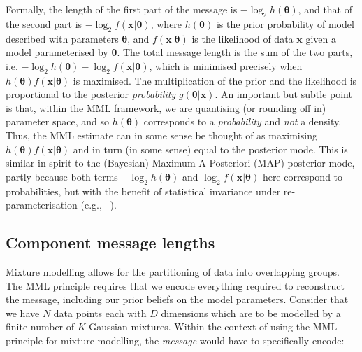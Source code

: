 \documentclass{elsarticle}
\newcommand{\vect}[1]{\boldsymbol{\mathbf{#1}}}
\renewcommand{\vec}[1]{\vect{#1}}
\begin{document}
Formally, the length of the first part of the message is
    $-\log_{2}h(\vec{\theta})$, 
and that of the second part is 
    $-\log_{2}f(\vec{x}|\vec{\theta})$, 
where $h(\vec{\theta})$ is the prior probability of model described with 
parameters $\vec{\theta}$, and 
    $f(\vec{x}|\vec{\theta})$ 
is the likelihood of data $\vec{x}$ given a model parameterised by $\vec{\theta}$. 
The total message length is the sum of the two parts, i.e. 
    $-\log_{2} h(\vec{\theta}) - \log_{2}f(\vec{x} | \vec{\theta})$, 
which is minimised precisely when $h(\vec{\theta}) f(\vec{x}|\vec{\theta})$
is maximised. The multiplication of the prior and the likelihood is 
proportional to the posterior {\em probability} $g(\vec{\theta}|\vec{x})$. 
An important but subtle point is that, within the MML framework, we are 
quantising (or rounding off in) parameter space, and so 
$h(\vec{\theta})$ corresponds to a {\em probability} and {\em not} 
a density. Thus, the MML estimate can in some sense be thought of as maximising 
    $h(\vec{\theta})f(\vec{x}|\vec{\theta})$ 
and in turn (in some sense) equal to the posterior mode. This is similar in 
spirit to the (Bayesian) Maximum A Posteriori (MAP) posterior mode, partly 
because both terms 
    $-\log_{2}h(\vec{\theta})$
and 
    $\log_{2} f(\vec{x}|\vec{\theta})$ 
here correspond to probabilities, but with the benefit of statistical 
invariance under re-parameterisation (e.g., ~\cite{WallaceFreeman1987,WallaceDowe1999a,Wallace05,dowe2007bayes}).


\subsection{Component message lengths}

Mixture modelling allows for the partitioning of data into overlapping groups.
The MML principle requires that we encode everything required to reconstruct 
the message, including our prior beliefs on the model parameters. Consider 
that we have $N$ data points each with $D$ dimensions which are to be modelled 
by a finite number of $K$ Gaussian mixtures. Within the context of using the 
MML principle for mixture modelling, the \emph{message} would have to 
specifically encode:
\end{document}
